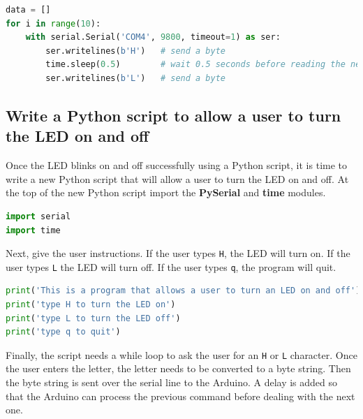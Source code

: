 \documentclass{book}
\begin{document}
    
        \begin{lstlisting}[language=Python]
data = []
for i in range(10):
    with serial.Serial('COM4', 9800, timeout=1) as ser:
        ser.writelines(b'H')   # send a byte
        time.sleep(0.5)        # wait 0.5 seconds before reading the next line
        ser.writelines(b'L')   # send a byte
\end{lstlisting}
    




    
        \subsection{Write a Python script to allow a user to turn the LED on and
off}\label{write-a-python-script-to-allow-a-user-to-turn-the-led-on-and-off}
    




    
        Once the LED blinks on and off successfully using a Python script, it is
time to write a new Python script that will allow a user to turn the LED
on and off. At the top of the new Python script import the
\textbf{PySerial} and \textbf{time} modules.
    




    
        \begin{lstlisting}[language=Python]
import serial
import time
\end{lstlisting}
    




    
        Next, give the user instructions. If the user types \lstinline!H!, the
LED will turn on. If the user types \lstinline!L! the LED will turn off.
If the user types \lstinline!q!, the program will quit.
    




    
        \begin{lstlisting}[language=Python]
print('This is a program that allows a user to turn an LED on and off')
print('type H to turn the LED on')
print('type L to turn the LED off')
print('type q to quit')
\end{lstlisting}
    




    
        Finally, the script needs a while loop to ask the user for an
\lstinline!H! or \lstinline!L! character. Once the user enters the
letter, the letter needs to be converted to a byte string. Then the byte
string is sent over the serial line to the Arduino. A delay is added so
that the Arduino can process the previous command before dealing with
the next one.
    
\end{document}
